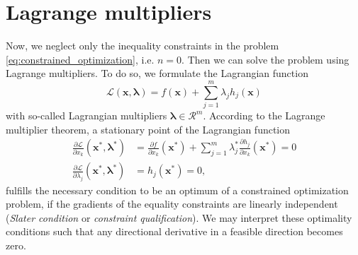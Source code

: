 \section{Lagrange multipliers}
Now, we neglect only the inequality constraints in the problem \eqref{eq:constrained_optimization}, i.e. $n=0$. Then we can solve the problem using Lagrange multipliers. To do so, we formulate the Lagrangian function
\begin{equation}
    \mathcal{L} (\mathbf{x}, \pmb{\lambda}) = f(\mathbf{x}) + \sum_{j=1}^m \lambda_j h_j(\mathbf{x}) 
\end{equation}
with so-called Lagrangian multipliers $\pmb{\lambda} \in \mathcal{R}^m$. 
According to the Lagrange multiplier theorem, a stationary point of the Lagrangian function 
\begin{align}
    \frac{\partial \mathcal{L}}{\partial x_k} (\mathbf{x}^*, \pmb{\lambda}^*) &= \frac{\partial f }{\partial x_k} (\mathbf{x}^*) + \sum_{j=1}^m \lambda_j^* \frac{\partial h_j}{\partial x_k} (\mathbf{x}^*) = 0\\
    \frac{\partial \mathcal{L}}{\partial \lambda_j} (\mathbf{x}^*, \pmb{\lambda}^*) &= h_j(\mathbf{x}^*) = 0,
\end{align}
fulfills the necessary condition to be an optimum of a constrained optimization problem, if the gradients of the equality constraints are linearly independent (\emph{Slater condition} or \emph{constraint qualification}). We may interpret these optimality conditions such that any directional derivative in a feasible direction becomes zero.

